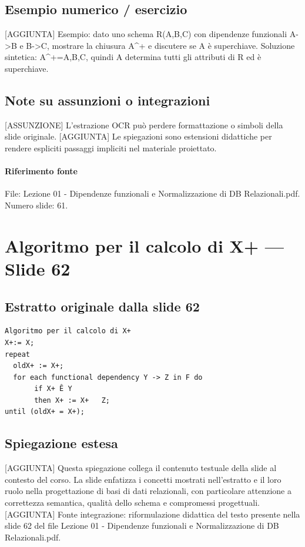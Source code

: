 \documentclass[11pt]{article}
\begin{document}
\subsection*{Esempio numerico / esercizio}
[AGGIUNTA] Esempio: dato uno schema R(A,B,C) con dipendenze funzionali A->B e B->C, mostrare la chiusura A^+ e discutere se A è superchiave. Soluzione sintetica: A^+={A,B,C}, quindi A determina tutti gli attributi di R ed è superchiave.
\subsection*{Note su assunzioni o integrazioni}
[ASSUNZIONE] L'estrazione OCR può perdere formattazione o simboli della slide originale.
[AGGIUNTA] Le spiegazioni sono estensioni didattiche per rendere espliciti passaggi impliciti nel materiale proiettato.
\paragraph{Riferimento fonte} File: Lezione 01 - Dipendenze funzionali e Normalizzazione di DB Relazionali.pdf. Numero slide: 61.
\section{Algoritmo per il calcolo di X+ --- Slide 62}
\subsection*{Estratto originale dalla slide 62}
\begin{lstlisting}
Algoritmo per il calcolo di X+
X+:= X;
repeat
  oldX+ := X+;
  for each functional dependency Y -> Z in F do
       if X+ Ê Y
       then X+ := X+   Z;
until (oldX+ = X+);
\end{lstlisting}
\subsection*{Spiegazione estesa}
[AGGIUNTA] Questa spiegazione collega il contenuto testuale della slide al contesto del corso. La slide enfatizza i concetti mostrati nell'estratto e il loro ruolo nella progettazione di basi di dati relazionali, con particolare attenzione a correttezza semantica, qualità dello schema e compromessi progettuali.
[AGGIUNTA] Fonte integrazione: riformulazione didattica del testo presente nella slide 62 del file Lezione 01 - Dipendenze funzionali e Normalizzazione di DB Relazionali.pdf.
\end{document}

